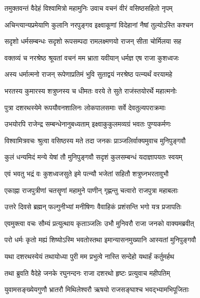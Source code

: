 
\twolineshloka
{तमुक्तवन्तं वैदेहं विश्वामित्रो महामुनिः}
{उवाच वचनं वीरं वसिष्ठसहितो नृपम्} %

\twolineshloka
{अचिन्त्यान्यप्रमेयाणि कुलानि नरपुङ्गव}
{इक्ष्वाकूणां विदेहानां नैषां तुल्योऽस्ति कश्चन} %

\twolineshloka
{सदृशो धर्मसम्बन्धः सदृशो रूपसम्पदा}
{रामलक्ष्मणयो राजन् सीता चोर्मिलया सह} %

\twolineshloka
{वक्तव्यं च नरश्रेष्ठ श्रूयतां वचनं मम}
{भ्राता यवीयान् धर्मज्ञ एष राजा कुशध्वजः} %

\twolineshloka
{अस्य धर्मात्मनो राजन् रूपेणाप्रतिमं भुवि}
{सुताद्वयं नरश्रेष्ठ पत्न्यर्थं वरयामहे} %

\twolineshloka
{भरतस्य कुमारस्य शत्रुघ्नस्य च धीमतः}
{वरये ते सुते राजंस्तयोरर्थे महात्मनोः} %

\twolineshloka
{पुत्रा दशरथस्येमे रूपयौवनशालिनः}
{लोकपालसमाः सर्वे देवतुल्यपराक्रमाः} %

\twolineshloka
{उभयोरपि राजेन्द्र सम्बन्धेनानुबध्यताम्}
{इक्ष्वाकुकुलमव्यग्रं भवतः पुण्यकर्मणः} %

\twolineshloka
{विश्वामित्रवचः श्रुत्वा वसिष्ठस्य मते तदा}
{जनकः प्राञ्जलिर्वाक्यमुवाच मुनिपुङ्गवौ} %

\twolineshloka
{कुलं धन्यमिदं मन्ये येषां तौ मुनिपुङ्गवौ}
{सदृशं कुलसम्बन्धं यदाज्ञापयतः स्वयम्} %

\twolineshloka
{एवं भवतु भद्रं वः कुशध्वजसुते इमे}
{पत्न्यौ भजेतां सहितौ शत्रुघ्नभरतावुभौ} %

\twolineshloka
{एकाह्ना राजपुत्रीणां चतसॄणां महामुने}
{पाणीन् गृह्णन्तु चत्वारो राजपुत्रा महाबलाः} %

\twolineshloka
{उत्तरे दिवसे ब्रह्मन् फल्गुनीभ्यां मनीषिणः}
{वैवाहिकं प्रशंसन्ति भगो यत्र प्रजापतिः} %

\twolineshloka
{एवमुक्त्वा वचः सौम्यं प्रत्युत्थाय कृताञ्जलिः}
{उभौ मुनिवरौ राजा जनको वाक्यमब्रवीत्} %

\twolineshloka
{परो धर्मः कृतो मह्यं शिष्योऽस्मि भवतोस्तथा}
{इमान्यासनमुख्यानि आस्यतां मुनिपुङ्गवौ} %

\twolineshloka
{यथा दशरथस्येयं तथायोध्या पुरी मम}
{प्रभुत्वे नास्ति सन्देहो यथार्हं कर्तुमर्हथ} %

\twolineshloka
{तथा ब्रुवति वैदेहे जनके रघुनन्दनः}
{राजा दशरथो हृष्टः प्रत्युवाच महीपतिम्} %

\twolineshloka
{युवामसङ्ख्येयगुणौ भ्रातरौ मिथिलेश्वरौ}
{ऋषयो राजसङ्घाश्च भवद्भ्यामभिपूजिताः} %

